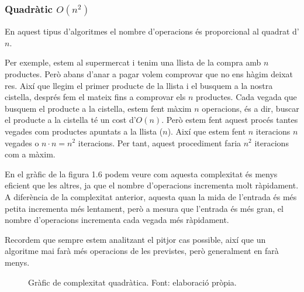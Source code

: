 \subsubsection*{Quadràtic $O(n^2)$}
En aquest tipus d'algoritmes el nombre d'operacions és proporcional al quadrat d'$n$. 

Per exemple, estem al supermercat i tenim una llista de la compra amb $n$ productes. Però abans d'anar a pagar volem comprovar que no ens hàgim deixat res. Així que llegim el primer producte de la llista i el busquem a la nostra cistella, després fem el mateix fins a comprovar els $n$ productes. Cada vegada que busquem el producte a la cistella, estem fent màxim $n$ operacions, és a dir, buscar el producte a la cistella té un cost d'$O(n)$. Però estem fent aquest procés tantes vegades com productes apuntats a la llista ($n$). Així que estem fent $n$ iteracions $n$ vegades o $n \cdot n = n^2$ iteracions. Per tant, aquest procediment faria $n^2$ iteracions com a màxim.

En el gràfic de la figura 1.6 podem veure com aquesta complexitat és menys eficient que les altres, ja que el nombre d'operacions incrementa molt ràpidament. A diferència de la complexitat anterior, aquesta quan la mida de l'entrada és més petita incrementa més lentament, però a mesura que l'entrada és més gran, el nombre d'operacions incrementa cada vegada més ràpidament. 

Recordem que sempre estem analitzant el pitjor cas possible, així que un algoritme mai farà més operacions de les previstes, però generalment en farà menys.

\begin{figure}[H]
    \centering
{}
    \caption[Gràfic de complexitat quadràtica.]{Gràfic de complexitat quadràtica. Font: elaboració pròpia.}
    \label{fig:my_label}
\end{figure}


